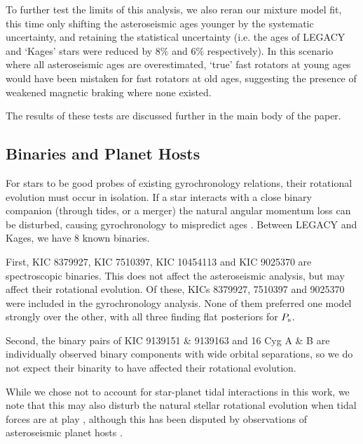 To further test the limits of this analysis, we also reran our mixture model fit, this time only shifting the asteroseismic ages younger by the systematic uncertainty, and retaining the statistical uncertainty (i.e. the ages of LEGACY and `Kages' stars were reduced by $8\%$ and $6\%$ respectively). In this scenario where all asteroseismic ages are overestimated, `true' fast rotators at young ages would have been mistaken for fast rotators at old ages, suggesting the presence of weakened magnetic braking where none existed. 

The results of these tests are discussed further in the main body of the paper.

\subsection{Binaries and Planet Hosts}
For stars to be good probes of existing gyrochronology relations, their rotational evolution must occur in isolation. If a star interacts with a close binary companion (through tides, or a merger) the natural angular momentum loss can be disturbed, causing gyrochronology to mispredict ages \cite{leiner+2019, fleming+2019}. Between LEGACY and Kages, we have 8 known binaries. 

First, KIC 8379927, KIC 7510397, KIC 10454113 and KIC 9025370 are spectroscopic binaries. This does not affect the asteroseismic analysis, but may affect their rotational evolution. Of these, KICs 8379927, 7510397 and 9025370 were included in the gyrochronology analysis. None of them preferred one model strongly over the other, with all three finding flat posteriors for $P_{\rm s}$.

Second, the binary pairs of KIC 9139151 \& 9139163 and 16 Cyg A \& B are individually observed binary components with wide orbital separations, so we do not expect their binarity to have affected their rotational evolution. 

While we chose not to account for star-planet tidal interactions in this work, we note that this may also disturb the natural stellar rotational evolution when tidal forces are at play \cite{maxted+2015,gallet+delorme2019, benbakoura+2019}, although this has been disputed by observations of asteroseismic planet hosts \cite{ceillier+2016}.\\